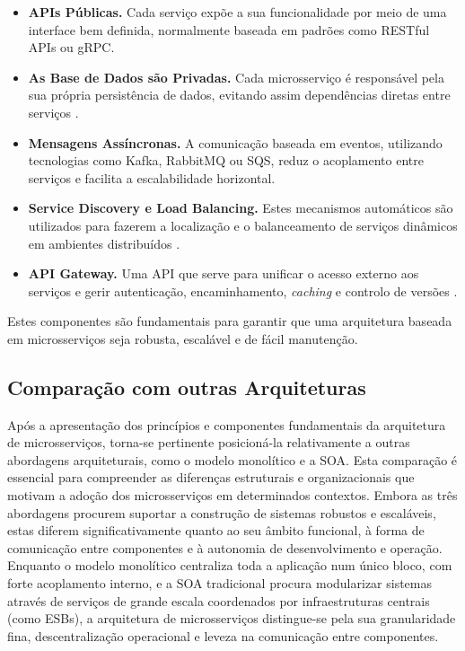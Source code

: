 \begin{itemize}
    \item \textbf{APIs Públicas.} Cada serviço expõe a sua funcionalidade por meio de uma interface bem definida, normalmente baseada em padrões como RESTful APIs ou gRPC.

    \item \textbf{As Base de Dados são Privadas.} Cada microsserviço é responsável pela sua própria persistência de dados, evitando assim dependências diretas entre serviços \cite{Dragoni2017}.

    \item \textbf{Mensagens Assíncronas.} A comunicação baseada em eventos, utilizando tecnologias como Kafka, RabbitMQ ou SQS, reduz o acoplamento entre serviços e facilita a escalabilidade horizontal.

    \item \textbf{Service Discovery e Load Balancing.} Estes mecanismos automáticos são utilizados para fazerem a localização e o balanceamento de serviços dinâmicos em ambientes distribuídos \cite{Newman2015}.

    \item \textbf{API Gateway.} Uma API que serve para unificar o acesso externo aos serviços e gerir autenticação, encaminhamento, \textit{ caching} e controlo de versões \cite{Richardson2018}.
\end{itemize}


Estes componentes são fundamentais para garantir que uma arquitetura baseada em microsserviços seja robusta, escalável e de fácil manutenção.

\subsection{Comparação com outras Arquiteturas}

Após a apresentação dos princípios e componentes fundamentais da arquitetura de microsserviços, torna-se pertinente posicioná-la relativamente a outras abordagens arquiteturais, como o modelo monolítico e a SOA. Esta comparação é essencial para compreender as diferenças estruturais e organizacionais que motivam a adoção dos microsserviços em determinados contextos. Embora as três abordagens procurem suportar a construção de sistemas robustos e escaláveis, estas diferem significativamente quanto ao seu âmbito funcional, à forma de comunicação entre componentes e à autonomia de desenvolvimento e operação. Enquanto o modelo monolítico centraliza toda a aplicação num único bloco, com forte acoplamento interno, e a SOA tradicional procura modularizar sistemas através de serviços de grande escala coordenados por infraestruturas centrais (como ESBs), a arquitetura de microsserviços distingue-se pela sua granularidade fina, descentralização operacional e leveza na comunicação entre componentes.

